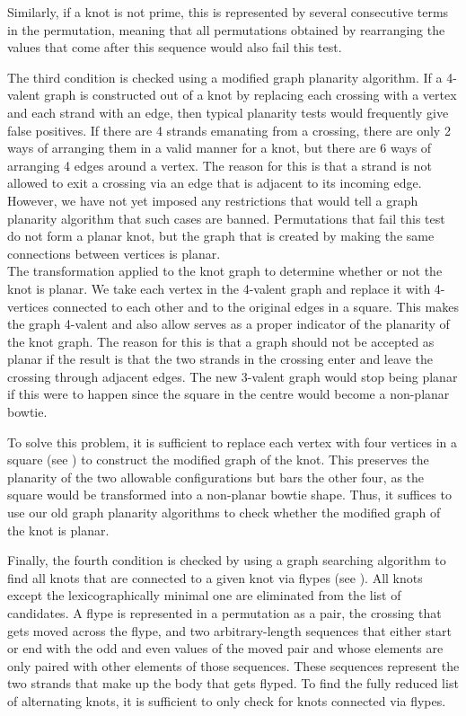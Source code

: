 \begin{paper}

Similarly, if a knot is not prime, this is represented by several consecutive
terms in the permutation, meaning that all permutations obtained by rearranging
the values that come after this sequence would also fail this test.

The third condition is checked using a modified graph planarity algorithm.
If a 4-valent graph is constructed out of a knot by replacing each crossing with
a vertex and each strand with an edge, then typical planarity tests would
frequently give false positives.
If there are 4 strands emanating from a crossing, there are only 2 ways of
arranging them in a valid manner for a knot, but there are 6 ways of arranging
4 edges around a vertex.
The reason for this is that a strand is not allowed to exit a crossing via an
edge that is adjacent to its incoming edge.
However, we have not yet imposed any restrictions that would tell a graph
planarity algorithm that such cases are banned.
Permutations that fail this test do not form a planar knot, but the graph that
is created by making the same connections between vertices is planar.\\

{The transformation applied to the knot graph to determine
whether or not the knot is planar.
We take each vertex in the 4-valent graph and replace it with 4-vertices
connected to each other and to the original edges in a square.
This makes the graph 4-valent and also allow serves as a proper indicator of the
planarity of the knot graph.
The reason for this is that a graph should not be accepted as planar if the
result is that the two strands in the crossing enter and leave the crossing
through adjacent edges.
The new 3-valent graph would stop being planar if this were to happen since the
square in the centre would become a non-planar bowtie.}

To solve this problem, it is sufficient to replace each vertex with four
vertices in a square (see \figGraph) to construct the modified graph of the
knot.
This preserves the planarity of the two allowable configurations but bars the
other four, as the square would be transformed into a non-planar bowtie shape.
Thus, it suffices to use our old graph planarity algorithms to check whether the
modified graph of the knot is planar.


Finally, the fourth condition is checked by using a graph searching algorithm to
find all knots that are connected to a given knot via flypes (see \figMoves).
All knots except the lexicographically minimal one are eliminated from the list
of candidates.
A flype is represented in a permutation as a pair, the crossing that gets moved
across the flype, and two arbitrary-length sequences that either start or end
with the odd and even values of the moved pair and whose elements are only
paired with other elements of those sequences.
These sequences represent the two strands that make up the body that gets
flyped.
To find the fully reduced list of alternating knots, it is sufficient to only
check for knots connected via flypes.


\end{paper}
